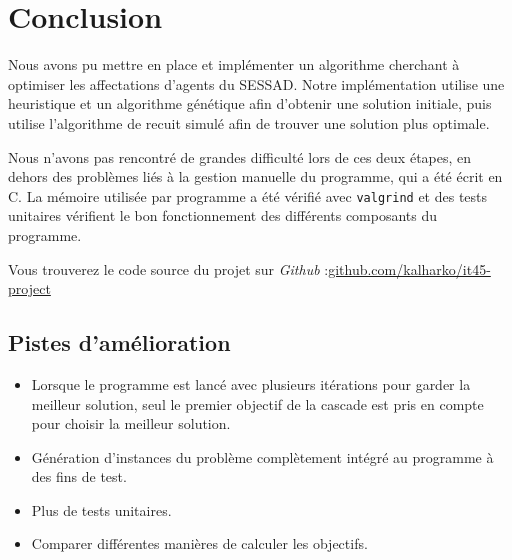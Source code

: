 \documentclass[11pt]{article}
\begin{document}
\newpage
\section{Conclusion}

Nous avons pu mettre en place et implémenter un algorithme cherchant à optimiser les affectations d'agents du SESSAD.
Notre implémentation utilise une heuristique et un algorithme génétique afin d'obtenir une solution initiale, puis utilise l'algorithme de recuit simulé afin de trouver une solution plus optimale.

Nous n'avons pas rencontré de grandes difficulté lors de ces deux étapes, en dehors des problèmes liés à la gestion manuelle du programme, qui a été écrit en C.
La mémoire utilisée par programme a été vérifié avec \texttt{valgrind} et des tests unitaires vérifient le bon fonctionnement des différents composants du programme.

Vous trouverez le code source du projet sur \emph{Github} :\newline \href{https://github.com/kalharko/it45-project}{github.com/kalharko/it45-project}

\subsection{Pistes d'amélioration}
\begin{itemize}
    \item Lorsque le programme est lancé avec plusieurs itérations pour garder la meilleur solution, seul le premier objectif de la cascade est pris en compte pour choisir la meilleur solution.
    \item Génération d'instances du problème complètement intégré au programme à des fins de test.
    \item Plus de tests unitaires.
    \item Comparer différentes manières de calculer les objectifs.
\end{itemize}
\end{document}
